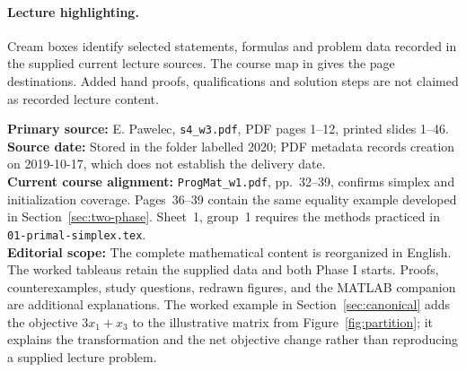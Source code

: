 \documentclass[11pt,a4paper]{article}
\begin{document}
\paragraph{Lecture highlighting.}
Cream boxes identify selected statements, formulas and problem data recorded in
the supplied current lecture sources. The course map in
 gives the page destinations. Added hand proofs,
qualifications and solution steps are not claimed as recorded lecture content.

\noindent\textbf{Primary source:} E. Pawelec, \texttt{s4\_w3.pdf},
PDF pages 1--12, printed slides 1--46.\\
\textbf{Source date:} Stored in the folder labelled 2020; PDF metadata records
creation on 2019-10-17, which does not establish the delivery date.\\
\textbf{Current course alignment:} \texttt{ProgMat\_w1.pdf}, pp.~32--39,
confirms simplex and initialization coverage. Pages~36--39 contain the same
equality example developed in Section~\ref{sec:two-phase}. Sheet~1, group~1
requires the methods practiced in \texttt{01-primal-simplex.tex}.\\
\textbf{Editorial scope:} The complete mathematical content is reorganized in
English. The worked tableaus retain the supplied data and both Phase I starts.
Proofs, counterexamples, study questions, redrawn figures, and the MATLAB
companion are additional explanations.
The worked example in Section~\ref{sec:canonical} adds the objective
$3x_1+x_3$ to the illustrative matrix from Figure~\ref{fig:partition};
it explains the transformation and the net objective change rather than
reproducing a supplied lecture problem.
\end{document}
